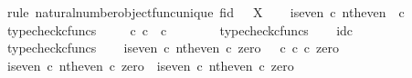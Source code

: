 \begin{isabellebody}
%
\isadelimproof
%
\endisadelimproof
%
\isatagproof
{}\isamarkupfalse%
\ {\isacharparenleft}{\kern0pt}rule\ natural{\isacharunderscore}{\kern0pt}number{\isacharunderscore}{\kern0pt}object{\isacharunderscore}{\kern0pt}func{\isacharunderscore}{\kern0pt}unique{\isacharbrackleft}{\kern0pt}\ f{\isacharequal}{\kern0pt}{\isachardoublequoteopen}id\ {\isasymOmega}{\isachardoublequoteclose}{\isacharcomma}{\kern0pt}\ \ X{\isacharequal}{\kern0pt}{\isasymOmega}{\isacharbrackright}{\kern0pt}{\isacharparenright}{\kern0pt}\isanewline
\ \ \isamarkupfalse%
\ {\isachardoublequoteopen}is{\isacharunderscore}{\kern0pt}even\ {\isasymcirc}\isactrlsub c\ nth{\isacharunderscore}{\kern0pt}even\ {\isacharcolon}{\kern0pt}\ {\isasymnat}\isactrlsub c\ {\isasymrightarrow}\ {\isasymOmega}{\isachardoublequoteclose}\isanewline
\ \ \ \ \isamarkupfalse%
\ typecheck{\isacharunderscore}{\kern0pt}cfuncs\isanewline
\ \ \isamarkupfalse%
\ {\isachardoublequoteopen}{\isasymt}\ {\isasymcirc}\isactrlsub c\ {\isasymbeta}\isactrlbsub {\isasymnat}\isactrlsub c\isactrlesub \ {\isacharcolon}{\kern0pt}\ {\isasymnat}\isactrlsub c\ {\isasymrightarrow}\ {\isasymOmega}{\isachardoublequoteclose}\isanewline
\ \ \ \ \isamarkupfalse%
\ typecheck{\isacharunderscore}{\kern0pt}cfuncs\isanewline
\ \ \isamarkupfalse%
\ {\isachardoublequoteopen}id\isactrlsub c\ {\isasymOmega}\ {\isacharcolon}{\kern0pt}\ {\isasymOmega}\ {\isasymrightarrow}\ {\isasymOmega}{\isachardoublequoteclose}\isanewline
\ \ \ \ \isamarkupfalse%
\ typecheck{\isacharunderscore}{\kern0pt}cfuncs\isanewline
\isanewline
\ \ \isamarkupfalse%
\ {\isachardoublequoteopen}{\isacharparenleft}{\kern0pt}is{\isacharunderscore}{\kern0pt}even\ {\isasymcirc}\isactrlsub c\ nth{\isacharunderscore}{\kern0pt}even{\isacharparenright}{\kern0pt}\ {\isasymcirc}\isactrlsub c\ zero\ {\isacharequal}{\kern0pt}\ {\isacharparenleft}{\kern0pt}{\isasymt}\ {\isasymcirc}\isactrlsub c\ {\isasymbeta}\isactrlbsub {\isasymnat}\isactrlsub c\isactrlesub {\isacharparenright}{\kern0pt}\ {\isasymcirc}\isactrlsub c\ zero{\isachardoublequoteclose}\isanewline
\ \ \isamarkupfalse%
\ {\isacharminus}{\kern0pt}\isanewline
\ \ \ \ \isamarkupfalse%
\ {\isachardoublequoteopen}{\isacharparenleft}{\kern0pt}is{\isacharunderscore}{\kern0pt}even\ {\isasymcirc}\isactrlsub c\ nth{\isacharunderscore}{\kern0pt}even{\isacharparenright}{\kern0pt}\ {\isasymcirc}\isactrlsub c\ zero\ {\isacharequal}{\kern0pt}\ is{\isacharunderscore}{\kern0pt}even\ {\isasymcirc}\isactrlsub c\ nth{\isacharunderscore}{\kern0pt}even\ {\isasymcirc}\isactrlsub c\ zero{\isachardoublequoteclose}\isanewline

\end{isabellebody}
